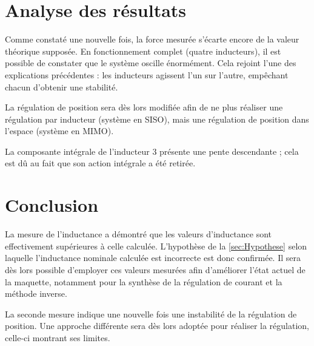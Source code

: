 \section{Analyse des résultats}
Comme constaté une nouvelle fois, la force mesurée s'écarte encore de la valeur théorique supposée. En fonctionnement complet (quatre inducteurs), il est possible de constater que le système oscille énormément. Cela rejoint l'une des explications précédentes : les inducteurs agissent l'un sur l'autre, empêchant chacun d'obtenir une stabilité.

La régulation de position sera dès lors modifiée afin de ne plus réaliser une régulation par inducteur (système en SISO), mais une régulation de position dans l'espace (système en MIMO).

La composante intégrale de l'inducteur 3 présente une pente descendante ; cela est dû au fait que son action intégrale a été retirée.

\section{Conclusion}
La mesure de l'inductance a démontré que les valeurs d'inductance sont effectivement supérieures à celle calculée. L'hypothèse de la \autoref{sec:Hypothese} selon laquelle l'inductance nominale calculée est incorrecte est donc confirmée. Il sera dès lors possible d'employer ces valeurs mesurées afin d'améliorer l'état actuel de la maquette, notamment pour la synthèse de la régulation de courant et la méthode inverse.

La seconde mesure indique une nouvelle fois une instabilité de la régulation de position. Une approche différente sera dès lors adoptée pour réaliser la régulation, celle-ci montrant ses limites.